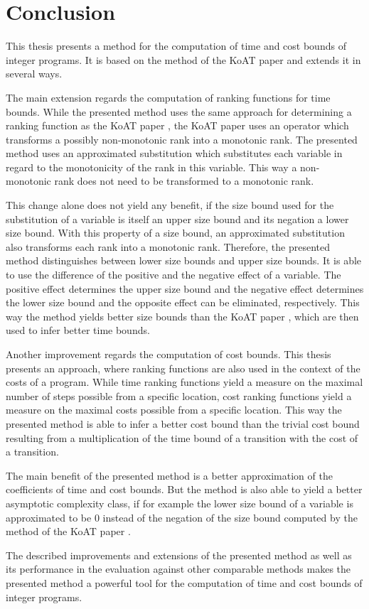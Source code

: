 \section{Conclusion}

This thesis presents a method for the computation of time and cost bounds of integer programs.
It is based on the method of the KoAT paper \cite{koat} and extends it in several ways.

The main extension regards the computation of ranking functions for time bounds.
While the presented method uses the same approach for determining a ranking function as the KoAT paper \cite{koat}, the KoAT paper uses an operator which transforms a possibly non-monotonic rank into a monotonic rank.
The presented method uses an approximated substitution which substitutes each variable in regard to the monotonicity of the rank in this variable.
This way a non-monotonic rank does not need to be transformed to a monotonic rank.

This change alone does not yield any benefit, if the size bound used for the substitution of a variable is itself an upper size bound and its negation a lower size bound.
With this property of a size bound, an approximated substitution also transforms each rank into a monotonic rank.
Therefore, the presented method distinguishes between lower size bounds and upper size bounds.
It is able to use the difference of the positive and the negative effect of a variable.
The positive effect determines the upper size bound and the negative effect determines the lower size bound and the opposite effect can be eliminated, respectively.
This way the method yields better size bounds than the KoAT paper \cite{koat}, which are then used to infer better time bounds.

Another improvement regards the computation of cost bounds.
This thesis presents an approach, where ranking functions are also used in the context of the costs of a program.
While time ranking functions yield a measure on the maximal number of steps possible from a specific location, cost ranking functions yield a measure on the maximal costs possible from a specific location.
This way the presented method is able to infer a better cost bound than the trivial cost bound resulting from a multiplication of the time bound of a transition with the cost of a transition.

The main benefit of the presented method is a better approximation of the coefficients of time and cost bounds.
But the method is also able to yield a better asymptotic complexity class, if for example the lower size bound of a variable is approximated to be $0$ instead of the negation of the size bound computed by the method of the KoAT paper \cite{koat}.

The described improvements and extensions of the presented method as well as its performance in the evaluation against other comparable methods makes the presented method a powerful tool for the computation of time and cost bounds of integer programs.
